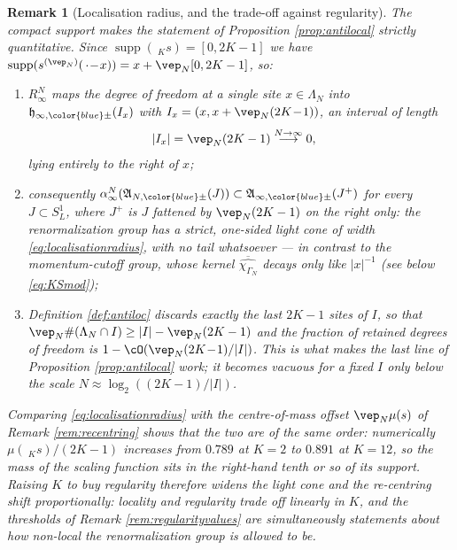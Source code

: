\documentclass[a4paper, 11pt]{article}
\newcommand{\fA}{\mathfrak{A}}\newcommand{\cA}{\mathcal{A}}\newcommand{\dA}{\mathds{A}}\newcommand{\sA}{\mathscr{A}}
\newcommand{\fh}{\mathfrak{h}}
\DeclareMathOperator{\1}{\mathds{1}}
\DeclareMathOperator{\supp}{supp}
\newtheorem{rem}[thm]{Remark}
\begin{document}
\begin{rem}[Localisation radius, and the trade-off against regularity]
\label{rem:localisationradius}
The compact support makes the statement of Proposition \ref{prop:antilocal} strictly quantitative. Since $\supp(\!\ _{K}s) = [0,2K-1]$ we have $\supp(s^{(\vep_{N})}(\!\ \cdot\!-\!x)) = x+\vep_{N}[0,2K-1]$, so:
\begin{enumerate}
\item[(i)] $R^{N}_{\infty}$ maps the degree of freedom at a single site $x\in\Lambda_{N}$ into $\fh_{\infty,{\color{blue}\pm}}(I_{x})$ with $I_{x} = (x,x+\vep_{N}(2K\!-\!1))$, an interval of length
\begin{align}
\label{eq:localisationradius}
|I_{x}| & = \vep_{N}(2K-1)\stackrel{N\rightarrow\infty}{\longrightarrow}0,
\end{align}
lying entirely to the \emph{right} of $x$;
\item[(ii)] consequently $\alpha^{N}_{\infty}(\fA_{N,{\color{blue}\pm}}(J))\subset\fA_{\infty,{\color{blue}\pm}}(J^{+})$ for every $J\subset S^{1}_{L}$, where $J^{+}$ is $J$ fattened by $\vep_{N}(2K-1)$ on the right only: the renormalization group has a strict, one-sided light cone of width \eqref{eq:localisationradius}, with no tail whatsoever --- in contrast to the momentum-cutoff group, whose kernel $\overline{\widehat{\chi_{\Gamma_{N}}}}$ decays only like $|x|^{-1}$ (see below \eqref{eq:KSmod});
\item[(iii)] Definition \ref{def:antiloc} discards exactly the last $2K-1$ sites of $I$, so that $\vep_{N}\#(\Lambda_{N}\cap I)\geq|I|-\vep_{N}(2K-1)$ and the fraction of retained degrees of freedom is $1-\cO(\vep_{N}(2K\!-\!1)/|I|)$. This is what makes the last line of Proposition \ref{prop:antilocal} work; it becomes vacuous for a fixed $I$ only below the scale $N\approx\log_{2}((2K-1)/|I|)$.
\end{enumerate}
Comparing \eqref{eq:localisationradius} with the centre-of-mass offset $\vep_{N}\mu(s)$ of Remark \ref{rem:recentring} shows that the two are of the same order: numerically $\mu(\!\ _{K}s)/(2K-1)$ increases from $0.789$ at $K=2$ to $0.891$ at $K=12$, so the mass of the scaling function sits in the right-hand tenth or so of its support. Raising $K$ to buy regularity therefore widens the light cone \emph{and} the re-centring shift proportionally: locality and regularity trade off linearly in $K$, and the thresholds of Remark \ref{rem:regularityvalues} are simultaneously statements about how non-local the renormalization group is allowed to be.
\end{rem}
\end{document}
